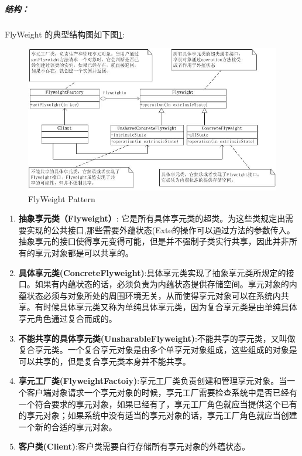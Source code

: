 \documentclass[UTF8,a4paper,12pt]{ctexbook}
\begin{document}
		\subparagraph{结构：}FlyWeight 的典型结构图如下图\ref{FlyWeight}:
			\begin{figure}[h]
				\centering
				\includegraphics[scale= 0.8]{FlyWeight.png}
				\caption{FlyWeight Pattern}
				\label{FlyWeight}
			\end{figure}
		
		\begin{enumerate}[itemindent = 1em]
			\item 	\textbf{抽象享元类（Flyweight）}:	它是所有具体享元类的超类。为这些类规定出需要实现的公共接口,那些需要外蕴状态(Exte的操作可以通过方法的参数传入。抽象享元的接口使得享元变得可能，但是并不强制子类实行共享，因此并非所有的享元对象都是可以共享的。
				
			\item 	\textbf{具体享元类(ConcreteFlyweight)}:具体享元类实现了抽象享元类所规定的接口。如果有内蕴状态的话，必须负责为内蕴状态提供存储空间。享元对象的内蕴状态必须与对象所处的周围环境无关，从而使得享元对象可以在系统内共享。有时候具体享元类又称为单纯具体享元类，因为复合享元类是由单纯具体享元角色通过复合而成的。
			
			\item 	\textbf{不能共享的具体享元类(UnsharableFlyweight)}:不能共享的享元类，又叫做复合享元类。一个复合享元对象是由多个单享元对象组成，这些组成的对象是可以共享的，但是复合享元类本身并不能共享。
			
			\item 	\textbf{享元工厂类(FlyweightFactoiy)}:享元工厂类负责创建和管理享元对象。当一个客户端对象请求一个享元对象的时候，享元工厂需要检查系统中是否已经有一个符合要求的享元对象，如果已经有了，享元工厂角色就应当提供这个已有的享元对象；如果系统中没有适当的享元对象的话，享元工厂角色就应当创建一个新的合适的享元对象。
			
			\item   \textbf{客户类(Client)}:客户类需要自行存储所有享元对象的外蕴状态。
		\end{enumerate}	
		
\end{document}
